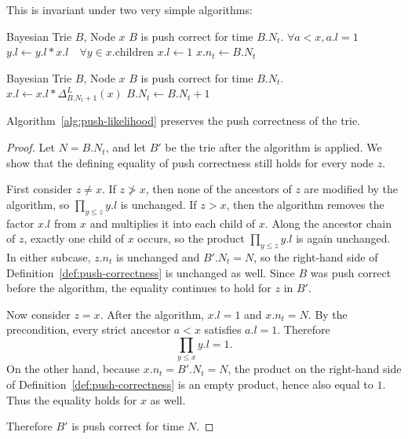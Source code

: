 This is invariant under two very simple algorithms:
\begin{algorithm}[H]
\caption{Push Likelihood}
\label{alg:push-likelihood}
\begin{algorithmic}[1]
\Require Bayesian Trie $B$, Node $x$
\Require $B$ is push correct for time $B.N_t$.
\Require $\forall a < x, a.l = 1$
\State $y.l \gets y.l * x.l  \quad \forall y \in x.\text{children}$
\State $x.l \gets 1$
\State $x.n_t \gets B.N_t$
\end{algorithmic}
\end{algorithm}

\begin{algorithm}[H]
\caption{Apply Likelihood Delta}
\label{alg:apply-likelihood-delta}
\begin{algorithmic}[1]
\Require Bayesian Trie $B$, Node $x$
\Require $B$ is push correct for time $B.N_t$.
    \State $x.l \gets x.l * \Delta^L_{B.N_t+1}(x)$
\EndFor
\State $B.N_t \gets B.N_t+1$
\end{algorithmic}
\end{algorithm}

\begin{theorem}
    Algorithm~\ref{alg:push-likelihood} preserves the push correctness of the trie.
\end{theorem}
\begin{proof}
    Let $N = B.N_t$, and let $B'$ be the trie after the algorithm is applied.
    We show that the defining equality of push correctness still holds for every node $z$.

    First consider $z \neq x$.
    If $z \not> x$, then none of the ancestors of $z$ are modified by the algorithm,
    so $\prod_{y \leq z} y.l$ is unchanged.
    If $z > x$, then the algorithm removes the factor $x.l$ from $x$ and multiplies it
    into each child of $x$.
    Along the ancestor chain of $z$, exactly one child of $x$ occurs, so the product
    $\prod_{y \leq z} y.l$ is again unchanged.
    In either subcase, $z.n_t$ is unchanged and $B'.N_t=N$, so the right-hand side
    of Definition~\ref{def:push-correctness} is unchanged as well.
    Since $B$ was push correct before the algorithm, the equality continues to hold for $z$ in $B'$.

    Now consider $z = x$.
    After the algorithm, $x.l = 1$ and $x.n_t = N$.
    By the precondition, every strict ancestor $a < x$ satisfies $a.l = 1$.
    Therefore
    \[
    \prod_{y \leq x} y.l = 1.
    \]
    On the other hand, because $x.n_t = B'.N_t = N$, the product on the right-hand side
    of Definition~\ref{def:push-correctness} is an empty product, hence also equal to $1$.
    Thus the equality holds for $x$ as well.

    Therefore $B'$ is push correct for time $N$.
\end{proof}


